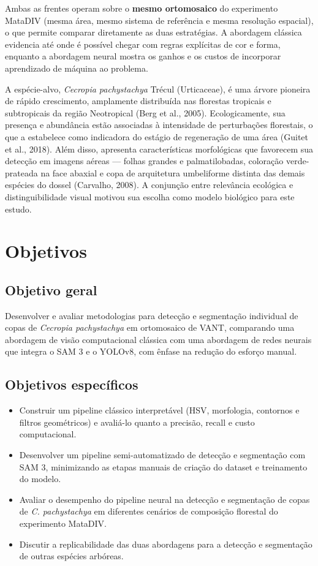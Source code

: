\documentclass[12pt, a4paper]{article}
\begin{document}
Ambas as frentes operam sobre o \textbf{mesmo ortomosaico} do experimento MataDIV
(mesma área, mesmo sistema de referência e mesma resolução espacial), o que
permite comparar diretamente as duas estratégias. A abordagem clássica evidencia
até onde é possível chegar com regras explícitas de cor e forma, enquanto a
abordagem neural mostra os ganhos e os custos de incorporar aprendizado de máquina
ao problema.

A espécie-alvo, \textit{Cecropia pachystachya} Trécul (Urticaceae), é uma árvore
pioneira de rápido crescimento, amplamente distribuída nas florestas tropicais e
subtropicais da região Neotropical (Berg et al., 2005). Ecologicamente, sua
presença e abundância estão associadas à intensidade de perturbações florestais,
o que a estabelece como indicadora do estágio de regeneração de uma área (Guitet
et al., 2018). Além disso, apresenta características morfológicas que favorecem sua
detecção em imagens aéreas — folhas grandes e palmatilobadas, coloração
verde-prateada na face abaxial e copa de arquitetura umbeliforme distinta das
demais espécies do dossel (Carvalho, 2008). A conjunção entre relevância ecológica
e distinguibilidade visual motivou sua escolha como modelo biológico para este
estudo.

\section{Objetivos}

\subsection*{Objetivo geral}

Desenvolver e avaliar metodologias para detecção e segmentação individual de copas
de \textit{Cecropia pachystachya} em ortomosaico de VANT, comparando uma abordagem
de visão computacional clássica com uma abordagem de redes neurais que integra o
SAM 3 e o YOLOv8, com ênfase na redução do esforço manual.

\subsection*{Objetivos específicos}

\begin{itemize}
    \item Construir um pipeline clássico interpretável (HSV, morfologia,
    contornos e filtros geométricos) e avaliá-lo quanto a precisão, recall e
    custo computacional.
    \item Desenvolver um pipeline semi-automatizado de detecção e segmentação com
    SAM 3, minimizando as etapas manuais de criação do dataset e treinamento do
    modelo.
    \item Avaliar o desempenho do pipeline neural na detecção e segmentação de
    copas de \textit{C. pachystachya} em diferentes cenários de composição
    florestal do experimento MataDIV.
    \item Discutir a replicabilidade das duas abordagens para a detecção e
    segmentação de outras espécies arbóreas.
\end{itemize}
\end{document}
